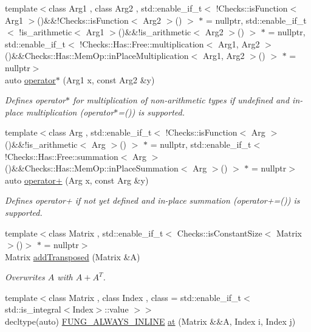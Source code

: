 \begin{DoxyCompactItemize}
{\footnotesize template$<$class Arg1 , class Arg2 , std\+::enable\+\_\+if\+\_\+t$<$ !\+Checks\+::is\+Function$<$ Arg1 $>$()\&\&!\+Checks\+::is\+Function$<$ Arg2 $>$() $>$ $\ast$  = nullptr, std\+::enable\+\_\+if\+\_\+t$<$ !is\+\_\+arithmetic$<$ Arg1 $>$()\&\&!is\+\_\+arithmetic$<$ Arg2 $>$() $>$ $\ast$  = nullptr, std\+::enable\+\_\+if\+\_\+t$<$ !\+Checks\+::\+Has\+::\+Free\+::multiplication$<$ Arg1, Arg2 $>$()\&\&\+Checks\+::\+Has\+::\+Mem\+Op\+::in\+Place\+Multiplication$<$ Arg1, Arg2 $>$() $>$ $\ast$  = nullptr$>$ }\\auto \hyperlink{namespaceFunG_ad023f2d2273af693f2b4ebceeb296dc8}{operator$\ast$} (Arg1 x, const Arg2 \&y)
\begin{DoxyCompactList}\small\item\em Defines operator$\ast$ for multiplication of non-\/arithmetic types if undefined and in-\/place multiplication (operator$\ast$=()) is supported. \end{DoxyCompactList}\item 
{\footnotesize template$<$class Arg , std\+::enable\+\_\+if\+\_\+t$<$ !\+Checks\+::is\+Function$<$ Arg $>$()\&\&!is\+\_\+arithmetic$<$ Arg $>$() $>$ $\ast$  = nullptr, std\+::enable\+\_\+if\+\_\+t$<$ !\+Checks\+::\+Has\+::\+Free\+::summation$<$ Arg $>$()\&\&\+Checks\+::\+Has\+::\+Mem\+Op\+::in\+Place\+Summation$<$ Arg $>$() $>$ $\ast$  = nullptr$>$ }\\auto \hyperlink{namespaceFunG_a063d3e8c19dbea3ee1396736fecb64e1}{operator+} (Arg x, const Arg \&y)
\begin{DoxyCompactList}\small\item\em Defines operator+ if not yet defined and in-\/place summation (operator+=()) is supported. \end{DoxyCompactList}\item 
{\footnotesize template$<$class Matrix , std\+::enable\+\_\+if\+\_\+t$<$ Checks\+::is\+Constant\+Size$<$ Matrix $>$()$>$ $\ast$  = nullptr$>$ }\\Matrix \hyperlink{namespaceFunG_a0211d0d26c669d56b5113fd2292902e5}{add\+Transposed} (Matrix \&A)
\begin{DoxyCompactList}\small\item\em Overwrites $A$ with $A+A^T$. \end{DoxyCompactList}\item 
{\footnotesize template$<$class Matrix , class Index , class  = std\+::enable\+\_\+if\+\_\+t$<$ std\+::is\+\_\+integral$<$\+Index$>$\+::value $>$$>$ }\\decltype(auto) \hyperlink{macros_8hh_a03b9da186125795e5afa49d0ef1cc32f}{F\+U\+N\+G\+\_\+\+A\+L\+W\+A\+Y\+S\+\_\+\+I\+N\+L\+I\+NE} \hyperlink{namespaceFunG_aae631e6149505bdfc0b1c6162b370c7f}{at} (Matrix \&\&A, Index i, Index j)

\end{DoxyCompactItemize}
